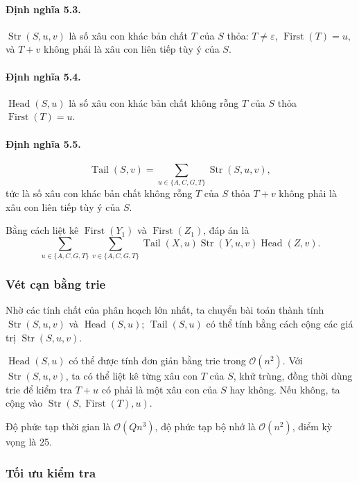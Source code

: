 \documentclass[11pt]{article}
\newcommand{\Oh}{\mathcal{O}}
\begin{document}
\paragraph{Định nghĩa 5.3.}
\(\operatorname{Str}(S,u,v)\) là số xâu con khác bản chất \(T\) của \(S\) thỏa:
\(T\ne\varepsilon\), \(\operatorname{First}(T)=u\), và \(T+v\) không phải là
xâu con liên tiếp tùy ý của \(S\).

\paragraph{Định nghĩa 5.4.}
\(\operatorname{Head}(S,u)\) là số xâu con khác bản chất không rỗng \(T\) của
\(S\) thỏa \(\operatorname{First}(T)=u\).

\paragraph{Định nghĩa 5.5.}
\[
  \operatorname{Tail}(S,v)=\sum_{u\in\{A,C,G,T\}}\operatorname{Str}(S,u,v),
\]
tức là số xâu con khác bản chất không rỗng \(T\) của \(S\) thỏa \(T+v\) không
phải là xâu con liên tiếp tùy ý của \(S\).

Bằng cách liệt kê \(\operatorname{First}(Y_1)\) và
\(\operatorname{First}(Z_1)\), đáp án là
\[
  \sum_{u\in\{A,C,G,T\}}\sum_{v\in\{A,C,G,T\}}
  \operatorname{Tail}(X,u)\operatorname{Str}(Y,u,v)\operatorname{Head}(Z,v).
\]

\subsubsection{Vét cạn bằng trie}

Nhờ các tính chất của phân hoạch lớn nhất, ta chuyển bài toán thành tính
\(\operatorname{Str}(S,u,v)\) và \(\operatorname{Head}(S,u)\);
\(\operatorname{Tail}(S,u)\) có thể tính bằng cách cộng các giá trị
\(\operatorname{Str}(S,u,v)\).

\(\operatorname{Head}(S,u)\) có thể được tính đơn giản bằng trie trong
\(\Oh(n^2)\). Với \(\operatorname{Str}(S,u,v)\), ta có thể liệt kê từng xâu con
\(T\) của \(S\), khử trùng, đồng thời dùng trie để kiểm tra \(T+u\) có phải là
một xâu con của \(S\) hay không. Nếu không, ta cộng vào
\(\operatorname{Str}(S,\operatorname{First}(T),u)\).

Độ phức tạp thời gian là \(\Oh(Qn^3)\), độ phức tạp bộ nhớ là \(\Oh(n^2)\),
điểm kỳ vọng là 25.

\subsubsection{Tối ưu kiểm tra}
\end{document}
